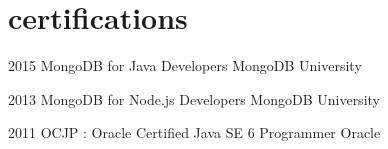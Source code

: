 \documentclass[]{friggeri-cv} %
\begin{document}

\section{certifications}

\begin{entrylist}


\entry
{2015}
{}
{MongoDB for Java Developers}
{MongoDB University}
{}
{}

\entry
{2013}
{}
{MongoDB for Node.js Developers}
{MongoDB University}
{}
{}

\entry
{2011}
{}
{OCJP : Oracle Certified Java SE 6 Programmer}
{Oracle}
{}
{}


\end{entrylist}



\end{document}
